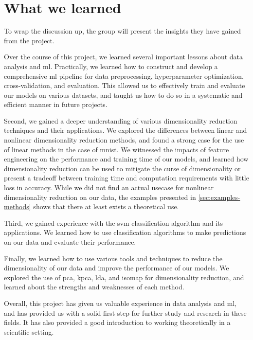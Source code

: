 \section{What we learned}\label{sec:what-we-learned}
To wrap the discussion up, the group will present the insights they have gained from the project.

Over the course of this project, we learned several important lessons about data analysis and \gls{ml}. Practically, we learned how to construct and develop a comprehensive \gls{ml} pipeline for data preprocessing, hyperparameter optimization, cross-validation, and evaluation. This allowed us to effectively train and evaluate our models on various datasets, and taught us how to do so in a systematic and efficient manner in future projects.

Second, we gained a deeper understanding of various dimensionality reduction techniques and their applications. We explored the differences between linear and nonlinear dimensionality reduction methods, and found a strong case for the use of linear methods in the case of \gls{mnist}. We witnessed the impacts of feature engineering on the performance and training time of our models, and learned how dimensionality reduction can be used to mitigate the curse of dimensionality or present a tradeoff between training time and computation requirements with little loss in accuracy. While we did not find an actual usecase for nonlinear dimensionality reduction on our data, the examples presented in \autoref{sec:examples-methods} shows that there at least exists a theoretical use.

Third, we gained experience with the \gls{svm} classification algorithm and its applications. We learned how to use classification algorithms to make predictions on our data and evaluate their performance.

Finally, we learned how to use various tools and techniques to reduce the dimensionality of our data and improve the performance of our models. We explored the use of \gls{pca}, \gls{kpca}, \gls{lda}, and \gls{isomap} for dimensionality reduction, and learned about the strengths and weaknesses of each method.

Overall, this project has given us valuable experience in data analysis and \gls{ml}, and has provided us with a solid first step for further study and research in these fields. It has also provided a good introduction to working theoretically in a scientific setting.
